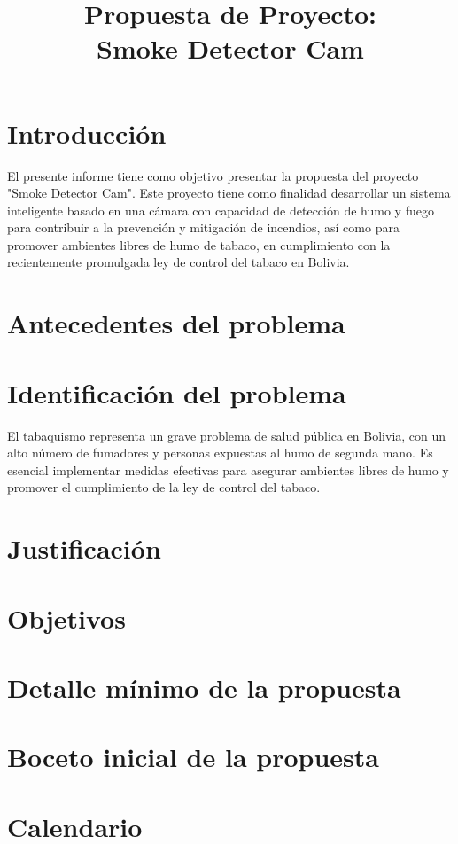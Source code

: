 \documentclass[letterpaper,12pt]{article}
\title{Propuesta de Proyecto:\\Smoke Detector Cam}
\begin{document}
\maketitle

\needspace{3cm}
\section{Introducción}

El presente informe tiene como objetivo presentar la propuesta del proyecto "Smoke Detector Cam". Este proyecto tiene como finalidad desarrollar un sistema inteligente basado en una cámara con capacidad de detección de humo y fuego para contribuir a la prevención y mitigación de incendios, así como para promover ambientes libres de humo de tabaco, en cumplimiento con la recientemente promulgada ley de control del tabaco en Bolivia.

\needspace{3cm}
\section{Antecedentes del problema}


\needspace{3cm}
\section{Identificación del problema}

El tabaquismo representa un grave problema de salud pública en Bolivia, con un alto número de fumadores y personas expuestas al humo de segunda mano. Es esencial implementar medidas efectivas para asegurar ambientes libres de humo y promover el cumplimiento de la ley de control del tabaco.

\needspace{4cm}
\section{Justificación} 


\needspace{3cm}
\section{Objetivos}


\needspace{3cm}
\section{Detalle mínimo de la propuesta}


\needspace{3cm}
\section{Boceto inicial de la propuesta}


\needspace{3cm}
\section{Calendario}


\printbibliography
\end{document}
